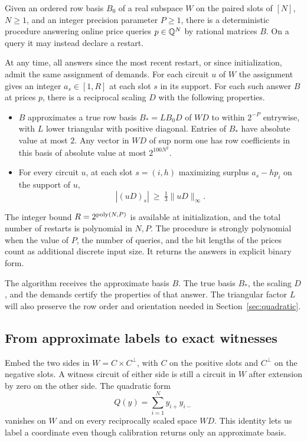\begin{theorem}[Calibration]\label{thm:cal}
Given an ordered row basis \(B_0\) of a real subspace \(W\)
on the paired slots of \([N]\), \(N\ge1\), and an integer precision
parameter \(P\ge1\), there is a deterministic procedure answering
online price queries \(p\in\mathbb Q^N\) by rational matrices \(B\).
On a query it may instead declare a restart.

At any time, all answers since the most recent restart, or since
initialization, admit the same assignment of demands. For each circuit
\(u\) of \(W\) the assignment gives an integer \(a_s\in[1,R]\) at each
slot \(s\) in its support.
For each such answer \(B\) at prices \(p\),
there is a reciprocal scaling \(D\) with the following properties.
\begin{itemize}
 \item \(B\) approximates a true row basis \(B_*=L B_0D\) of \(WD\)
 to within \(2^{-P}\) entrywise, with \(L\) lower triangular with
 positive diagonal. Entries of \(B_*\) have absolute value at most
 \(2\). Any vector in \(WD\) of sup norm one has row coefficients
 in this basis of absolute value at most \(2^{100N^2}\).
 \item For every circuit \(u\), at each slot \(s=(i,h)\) maximizing
 surplus \(a_s-hp_i\) on the support of \(u\),
 \[
       |(uD)_s|\ \ge\ \tfrac13\|uD\|_\infty .
 \]
\end{itemize}

The integer bound \(R=2^{\operatorname{poly}(N,P)}\) is available at initialization,
and the total number of restarts is polynomial in \(N,P\). The
procedure is strongly polynomial when the value of \(P\), the number
of queries, and the bit lengths of the prices count as additional
discrete input size. It returns the answers in explicit binary form.
\end{theorem}

The algorithm receives the approximate basis \(B\). The true basis
\(B_*\), the scaling \(D\), and the demands certify the properties of
that answer. The triangular factor \(L\) will also preserve the row
order and orientation needed in Section~\ref{sec:quadratic}.

\subsection{From approximate labels to exact witnesses}

Embed the two sides in \(W=C\times C^\perp\), with \(C\) on the positive
slots and \(C^\perp\) on the negative slots. A witness circuit of either
side is still a circuit in \(W\) after extension by zero on the other
side. The quadratic form
\[
 Q(y)=\sum_{i=1}^N y_{i+}y_{i-}
\]
vanishes on \(W\) and on every reciprocally scaled space \(WD\).
This identity lets us label a coordinate even though calibration returns
only an approximate basis.

